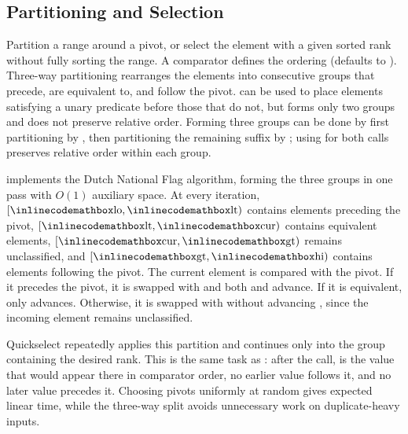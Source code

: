 \subsection{Partitioning and Selection}
\label{sec:1.1.2}
Partition a range around a pivot, or select the element with a given sorted rank without fully sorting the range. A comparator  defines the ordering (defaults to ). Three-way partitioning rearranges the elements into consecutive groups that precede, are equivalent to, and follow the pivot.  can be used to place elements satisfying a unary predicate before those that do not, but forms only two groups and does not preserve relative order. Forming three groups can be done by first partitioning by , then partitioning the remaining suffix by ; using  for both calls preserves relative order within each group.

 implements the Dutch National Flag algorithm, forming the three groups in one pass with $O(1)$ auxiliary space. At every iteration, $[{\inlinecodemath{lo}}, {\inlinecodemath{lt}})$ contains elements preceding the pivot, $[{\inlinecodemath{lt}}, {\inlinecodemath{cur}})$ contains equivalent elements, $[{\inlinecodemath{cur}}, {\inlinecodemath{gt}})$ remains unclassified, and $[{\inlinecodemath{gt}}, {\inlinecodemath{hi}})$ contains elements following the pivot. The current element  is compared with the pivot. If it precedes the pivot, it is swapped with  and both  and  advance. If it is equivalent, only  advances. Otherwise, it is swapped with  without advancing , since the incoming element remains unclassified.

Quickselect repeatedly applies this partition and continues only into the group containing the desired rank. This is the same task as : after the call,  is the value that would appear there in comparator order, no earlier value follows it, and no later value precedes it. Choosing pivots uniformly at random gives expected linear time, while the three-way split avoids unnecessary work on duplicate-heavy inputs.

